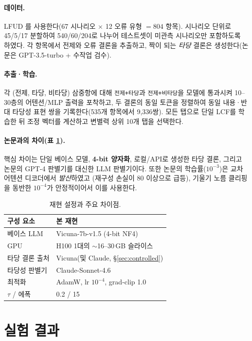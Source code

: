 \documentclass[11pt]{article}
\begin{document}
\paragraph{데이터.} LFUD \citep{li2024lfud}를 사용한다(67 시나리오 $\times$ 12 오류
유형 $=804$ 항목). 시나리오 단위로 45/5/17 분할하여 540/60/204로 나누어 테스트셋이 미관측
시나리오만 포함하도록 하였다. 각 항목에서 전제와 오류 결론을 추출하고, 짝이 되는
\emph{타당} 결론은 생성한다(논문은 GPT-3.5-turbo + 수작업 검수).

\paragraph{추출·학습.} 각 (전제, 타당, 비타당) 삼중항에 대해 \texttt{전제+타당}과
\texttt{전제+비타당}을 모델에 통과시켜 10--30층의 어텐션/MLP 출력을 포착하고, 두 결론의
동일 토큰을 정렬하여 동일 내용·반대 타당성 표현 쌍을 기록한다(535개 항목에서 9{,}336쌍).
모든 탭으로 단일 LCF를 학습한 뒤 조정 벡터를 계산하고 변별력 상위 10개 탭을 선택한다.

\paragraph{논문과의 차이(표 \ref{tab:setup}).} 핵심 차이는 단일 베이스 모델,
\textbf{4-bit 양자화}, 로컬/API로 생성한 타당 결론, 그리고 논문의 GPT-4 판별기를 대신한
LLM 판별기이다. 또한 논문의 학습률($10^{-3}$)은 교차 어텐션 디코더에서 \emph{발산}하였고
(재구성 손실이 $80$ 이상으로 급등), 기울기 노름 클리핑을 동반한 $10^{-4}$가 안정적이어서
이를 사용한다.

\begin{table}[t]
\centering\small
\begin{tabular}{ll}
\toprule
구성 요소 & 본 재현 \\
\midrule
베이스 LLM & Vicuna-7b-v1.5 (4-bit NF4) \\
GPU & H100 1대의 $\sim$16--30\,GB 슬라이스 \\
타당 결론 출처 & Vicuna(및 Claude, \S\ref{sec:controlled}) \\
타당성 판별기 & Claude-Sonnet-4.6 \\
최적화 & AdamW, lr $10^{-4}$, grad-clip 1.0 \\
$\tau$ / 에폭 & 0.2 / 15 \\
\bottomrule
\end{tabular}
\caption{재현 설정과 주요 차이점.}
\label{tab:setup}
\end{table}

\section{실험 결과}
\end{document}
